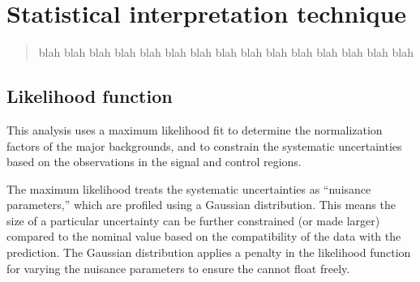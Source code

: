 \chapter[Statistical interpretation technique][Statistical interpretation]
        {Statistical interpretation technique}
\label{apx:stat_interpretation}

\begin{quote}
blah blah blah blah blah blah blah blah blah blah blah blah blah blah blah
\end{quote}

\section{Likelihood function}
\label{apx:likelihood}

This analysis uses a maximum likelihood fit to determine the normalization
factors of the major backgrounds, and to constrain the systematic uncertainties
based on the observations in the signal and control regions.

The maximum likelihood treats the systematic uncertainties as ``nuisance
parameters,'' which are profiled using a Gaussian distribution.
This means the size of a particular uncertainty can be further
constrained (or made larger) compared to the nominal value based on the
compatibility of the data with the prediction.
The Gaussian distribution applies a penalty in the likelihood function for
varying the nuisance parameters to ensure the cannot float freely.

